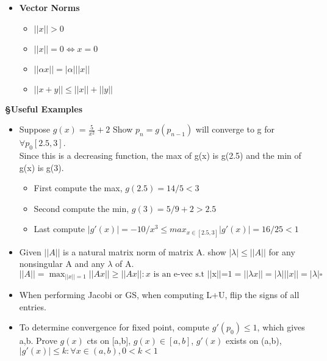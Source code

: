 \documentclass{article}
\begin{document}
\begin{tcolorbox}[colframe=black,colback=white,boxrule=0.3pt,arc=1pt,
left=0pt,right=0pt,top=0pt,bottom=0pt]
\begin{minipage}[t]{0.49\textwidth}
\begin{itemize}
    \item \textbf{Vector Norms}\\
    \begin{minipage}[t]{0.45\textwidth}
    \begin{itemize}
       \item $||x||>0$
       \item $||x|| = 0\Leftrightarrow x=0$
    \end{itemize}
    \end{minipage}
    \hfill
    \begin{minipage}[t]{0.45\textwidth}
    \begin{itemize}
       \item $||\alpha x|| = |\alpha| ||x||$
       \item $||x+y||\le ||x|| + ||y||$
    \end{itemize}
    \end{minipage}
\end{itemize}
\textbf{\S Useful Examples}
\begin{itemize}
    \item Suppose $g(x)=\frac{5}{x^2}+2$ Show $p_n=g(p_{n-1})$ will converge to g for $\forall p_0[2.5,3]$.\\
    Since this is a decreasing function, the max of g(x) is g(2.5) and the min of g(x) is g(3).
    \begin{itemize}
        \item First compute the max, $g(2.5)=14/5 < 3$
        \item Second compute the min, $g(3)=5/9 + 2>2.5$
        \item Last compute $|g'(x)|=-10/x^3 \le max_{x\in[2.5,3]}|g'(x)|=16/25<1$
    \end{itemize}
    \item Given $||A||$ is a natural matrix norm of matrix A. show $|\lambda|\le||A||$ for any nonsingular A and any $\lambda$ of A.
    $||A||=\max_{||x||=1}||Ax|| \ge ||Ax||:x \text{ is an e-vec s.t ||x||=1}=||\lambda x|| = |\lambda|||x||=|\lambda|\square$
    \item When performing Jacobi or GS, when computing L+U, flip the signs of all entries.
    \item To determine convergence for fixed point, compute $g'(p_0)\le1$, which gives a,b. Prove $g(x)$ cts on [a,b], $g(x)\in[a,b]$, $g'(x)$ exists on (a,b), $|g'(x)|\le k:\forall x \in(a,b), 0<k<1$
\end{itemize}
\end{minipage}
\hfill
\begin{minipage}[t]{0.49\textwidth}

\end{minipage}
\end{tcolorbox}
\end{document}
